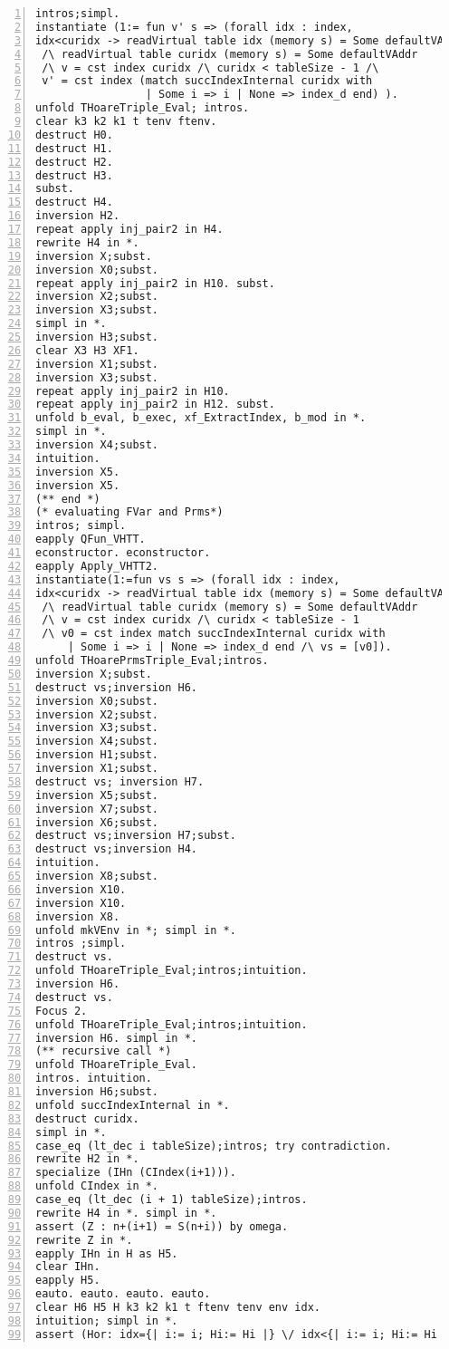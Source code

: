 \begin{appendices}
\begin{lstlisting}[xleftmargin=-.1\textwidth,
xrightmargin=-.1\textwidth,
mathescape=true,numbers=left]
intros;simpl.
instantiate (1:= fun v' s => (forall idx : index,
idx<curidx -> readVirtual table idx (memory s) = Some defaultVAddr) 
 /\ readVirtual table curidx (memory s) = Some defaultVAddr 
 /\ v = cst index curidx /\ curidx < tableSize - 1 /\
 v' = cst index (match succIndexInternal curidx with 
                 | Some i => i | None => index_d end) ).
unfold THoareTriple_Eval; intros.
clear k3 k2 k1 t tenv ftenv.
destruct H0.
destruct H1.
destruct H2.
destruct H3.
subst.
destruct H4.
inversion H2.
repeat apply inj_pair2 in H4.
rewrite H4 in *.
inversion X;subst.
inversion X0;subst.
repeat apply inj_pair2 in H10. subst.
inversion X2;subst.
inversion X3;subst.
simpl in *.
inversion H3;subst.
clear X3 H3 XF1.
inversion X1;subst.
inversion X3;subst.
repeat apply inj_pair2 in H10.
repeat apply inj_pair2 in H12. subst.
unfold b_eval, b_exec, xf_ExtractIndex, b_mod in *.
simpl in *.
inversion X4;subst.
intuition.
inversion X5.
inversion X5.
(** end *)
(* evaluating FVar and Prms*)
intros; simpl.
eapply QFun_VHTT.
econstructor. econstructor.
eapply Apply_VHTT2.
instantiate(1:=fun vs s => (forall idx : index,
idx<curidx -> readVirtual table idx (memory s) = Some defaultVAddr) 
 /\ readVirtual table curidx (memory s) = Some defaultVAddr 
 /\ v = cst index curidx /\ curidx < tableSize - 1 
 /\ v0 = cst index match succIndexInternal curidx with
     | Some i => i | None => index_d end /\ vs = [v0]).
unfold THoarePrmsTriple_Eval;intros.
inversion X;subst.
destruct vs;inversion H6.
inversion X0;subst.
inversion X2;subst.
inversion X3;subst.
inversion X4;subst.
inversion H1;subst.
inversion X1;subst.
destruct vs; inversion H7.
inversion X5;subst.
inversion X7;subst.
inversion X6;subst.
destruct vs;inversion H7;subst.
destruct vs;inversion H4.
intuition.
inversion X8;subst.
inversion X10.
inversion X10.
inversion X8.
unfold mkVEnv in *; simpl in *.
intros ;simpl.
destruct vs.
unfold THoareTriple_Eval;intros;intuition.
inversion H6.
destruct vs.
Focus 2.
unfold THoareTriple_Eval;intros;intuition.
inversion H6. simpl in *.
(** recursive call *)
unfold THoareTriple_Eval.
intros. intuition.
inversion H6;subst.
unfold succIndexInternal in *.
destruct curidx.
simpl in *.
case_eq (lt_dec i tableSize);intros; try contradiction.
rewrite H2 in *.
specialize (IHn (CIndex(i+1))).
unfold CIndex in *.
case_eq (lt_dec (i + 1) tableSize);intros.
rewrite H4 in *. simpl in *.
assert (Z : n+(i+1) = S(n+i)) by omega.
rewrite Z in *.
eapply IHn in H as H5.
clear IHn.
eapply H5.
eauto. eauto. eauto. eauto.
clear H6 H5 H k3 k2 k1 t ftenv tenv env idx.
intuition; simpl in *.
assert (Hor: idx={| i:= i; Hi:= Hi |} \/ idx<{| i:= i; Hi:= Hi |}).

\end{lstlisting}
\end{appendices}
